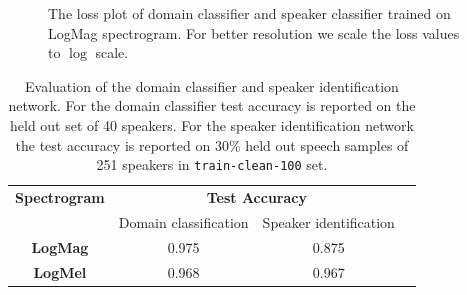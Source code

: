 \begin{figure}[h]
    \centering
    \qquad
    \caption[Loss plot of evaluation models (b)]{The loss plot of domain classifier and speaker classifier trained on LogMag spectrogram. For better resolution we scale the loss values to $\log$ scale.}
    \label{fig:loss_plot_dm_sp}
\end{figure}

\begin{table}[]
    \centering
    \begin{tabular}{cccc}
    \toprule
\textbf{Spectrogram} & \multicolumn{2}{c}{\textbf{Test Accuracy}} \\
& Domain classification & Speaker identification \\
\midrule    
    \textbf{LogMag} & 0.975 & 0.875\\
    \textbf{LogMel} & 0.968  &0.967\\
    \bottomrule 
    \end{tabular}
    \caption[Evaluation of domain classifier and speaker identification network.]{Evaluation of the domain classifier and speaker identification network. For the domain classifier test accuracy is reported on the held out set of 40 speakers. For the speaker identification network the test accuracy is reported on 30\% held out speech samples of 251 speakers in \texttt{train-clean-100} set.}
    \label{tab:base_perform}
\end{table}

